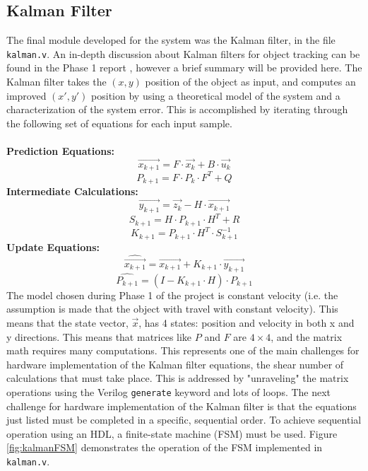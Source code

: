 \documentclass[11pt]{article} %
\begin{document}
\subsection{Kalman Filter}
The final module developed for the system was the Kalman filter, in the file \texttt{kalman.v}. An in-depth discussion about Kalman filters for object tracking can be found in the Phase 1 report \cite{phase1}, however a brief summary will be provided here. The Kalman filter takes the $(x,y)$ position of the object as input, and computes an improved $(x',y')$ position by using a theoretical model of the system and a characterization of the system error. This is accomplished by iterating through the following set of equations for each input sample. \\\\	
\textbf{Prediction Equations:}
\begin{equation}
\vec{x_{k+1}} = F \cdot \vec{x_k} + B \cdot \vec{u_k}
\label{eq:firstkalman}
\end{equation}
\begin{equation}
P_{k+1} = F \cdot P_k \cdot F^T + Q
\end{equation}
\textbf{Intermediate Calculations:}
\begin{equation}
\vec{y_{k+1}} = \vec{z_k} - H \cdot \vec{x_{k+1}}
\end{equation}
\begin{equation}
S_{k+1} = H \cdot P_{k+1} \cdot H^T + R
\end{equation}
\begin{equation}
K_{k+1} = P_{k+1} \cdot H^T \cdot S_{k+1}^{-1}
\end{equation}
\textbf{Update Equations:}
\begin{equation}
\hat{\vec{x_{k+1}}} = \vec{x_{k+1}} + K_{k+1} \cdot \vec{y_{k+1}}
\end{equation}
\begin{equation}
\hat{P_{k+1}} = (I - K_{k+1} \cdot H) \cdot P_{k+1}
\end{equation}
The model chosen during Phase 1 of the project is constant velocity (i.e. the assumption is made that the object with travel with constant velocity). This means that the state vector, $\vec{x}$, has 4 states: position and velocity in both x and y directions. This means that matrices like $P$ and $F$ are $4 \times 4$, and the matrix math requires many computations. This represents one of the main challenges for hardware implementation of the Kalman filter equations, the shear number of calculations that must take place. This is addressed by "unraveling" the matrix operations using the Verilog \texttt{generate} keyword and lots of loops. The next challenge for hardware implementation of the Kalman filter is that the equations just listed must be completed in a specific, sequential order. To achieve sequential operation using an HDL, a finite-state machine (FSM) must be used. Figure \ref{fig:kalmanFSM} demonstrates the operation of the FSM implemented in \texttt{kalman.v}.
\end{document}
